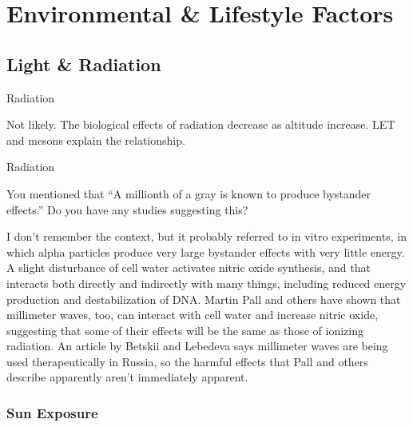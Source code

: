 \documentclass[11pt,oneside,openany,extrafontsizes]{memoir}
\begin{document}
\chapter{Environmental \& Lifestyle Factors}

\section{Light \& Radiation}

\begin{standalonequote}{Radiation}

    \begin{answer}
        Not likely. The biological effects of radiation decrease as altitude increase. LET and mesons explain the relationship.
    \end{answer}
\end{standalonequote}

\begin{qaexchange}{Radiation}

    \begin{question}
        You mentioned that \enquote{A millionth of a gray is known to produce bystander effects.} Do you have any studies suggesting this?
    \end{question}

    \begin{answer}
        I don't remember the context, but it probably referred to in vitro experiments, in which alpha particles produce very large bystander effects with very little energy. A slight disturbance of cell water activates nitric oxide synthesis, and that interacts both directly and indirectly with many things, including reduced energy production and destabilization of DNA. Martin Pall and others have shown that millimeter waves, too, can interact with cell water and increase nitric oxide, suggesting that some of their effects will be the same as those of ionizing radiation. An article by Betskii and Lebedeva says millimeter waves are being used therapeutically in Russia, so the harmful effects that Pall and others describe apparently aren't immediately apparent.
    \end{answer}
\end{qaexchange}

\subsection{Sun Exposure}
\end{document}
